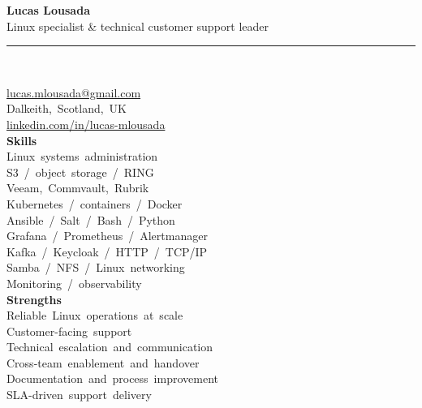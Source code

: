 \documentclass[9pt,a4paper]{article}
\begin{document}
{\color{accent}\LARGE\bfseries Lucas Lousada}\\[0.25em]
{\large Linux specialist \& technical customer support leader}\\[0.75em]
\noindent\rule{\linewidth}{0.5pt}\\[0.7em]
\begin{minipage}[t]{0.33\textwidth}
  \mbox{\href{mailto:lucas.mlousada@gmail.com}{lucas.mlousada@gmail.com}}\\
  \mbox{Dalkeith, Scotland, UK}\\
  \mbox{\href{https://www.linkedin.com/in/lucas-mlousada/}{linkedin.com/in/lucas-mlousada}}\\[0.75em]
  \textbf{Skills}\\
  \mbox{Linux systems administration}\\
  \mbox{S3 / object storage / RING}\\
  \mbox{Veeam, Commvault, Rubrik}\\
  \mbox{Kubernetes / containers / Docker}\\
  \mbox{Ansible / Salt / Bash / Python}\\
  \mbox{Grafana / Prometheus / Alertmanager}\\
  \mbox{Kafka / Keycloak / HTTP / TCP/IP}\\
  \mbox{Samba / NFS / Linux networking}\\
  \mbox{Monitoring / observability}\\[0.75em]
  \textbf{Strengths}\\
  \mbox{Reliable Linux operations at scale}\\
  \mbox{Customer-facing support}\\
  \mbox{Technical escalation and communication}\\
  \mbox{Cross-team enablement and handover}\\
  \mbox{Documentation and process improvement}\\
  \mbox{SLA-driven support delivery}\\
\end{minipage}
\hfill
\end{document}
